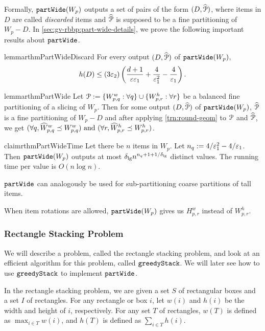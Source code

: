 Formally, $\operatorname{\mathtt{partWide}}(W_p)$ outputs a set of pairs of the form $(D, \widehat{\mathcal{P}})$,
where items in $D$ are called \emph{discarded} items and $\widehat{\mathcal{P}}$ is supposed to be
a fine partitioning of $W_p - D$.
In \cref{sec:gv-rbbp:part-wide-details}, we prove the following important
results about $\operatorname{\mathtt{partWide}}$.

\begin{restatable}{lemma}{rthmPartWideDiscard}
\label{lem:part-wide-discard}
For every output $(D, \widehat{\mathcal{P}})$ of $\operatorname{\mathtt{partWide}}(W_p)$,
\[ h(D) \le (3\varepsilon_2)\left( \frac{d+1}{\varepsilon\varepsilon_1} + \frac{4}{\varepsilon_1^2}
    - \frac{4}{\varepsilon_1} \right). \]
\end{restatable}

\begin{restatable}{lemma}{rthmPartWide}
\label{lem:part-wide}
Let $\mathcal{P} := \{W_{p,q}^w: \forall q\} \cup \{W_{p,r}^h: \forall r\}$ be
a balanced fine partitioning of a slicing of $W_p$.
Then for some output $(D, \widehat{\mathcal{P}})$ of $\operatorname{\mathtt{partWide}}(W_p)$,
$\widehat{\mathcal{P}}$ is a fine partitioning of $W_p - D$
and after applying \cref{trn:round-geom} to $\mathcal{P}$ and $\widehat{\mathcal{P}}$, we get
$(\forall q, \widehat{W}^w_{p,q} \preceq W^w_{p,q})
\textrm{ and } (\forall r, \widehat{W}^h_{p,r} \preceq W^h_{p,r})$.
\end{restatable}

\begin{restatable}{claim}{rthmPartWideTime}
\label{claim:part-wide-time}
Let there be $n$ items in $W_p$. Let $n_q := 4/\varepsilon_1^2 - 4/\varepsilon_1$.
Then $\operatorname{\mathtt{partWide}}(W_p)$ outputs at most $\delta_{\mathrm{lg}} n^{n_q + 1 + 1/\delta_{\mathrm{lg}}}$
distinct values. The running time per value is $O(n\log n)$.
\end{restatable}

$\operatorname{\mathtt{partWide}}$ can analogously be used for sub-partitioning coarse partitions of tall items.

When item rotations are allowed, $\operatorname{\mathtt{partWide}}(W_p)$ gives us $H^w_{p,r}$ instead of $W^h_{p,r}$.

\subsubsection{Rectangle Stacking Problem}
\label{sec:gv-rbbp:greedy-stack}

We will describe a problem, called the rectangle stacking problem,
and look at an efficient algorithm for this problem, called $\operatorname{\mathtt{greedyStack}}$.
We will later see how to use $\operatorname{\mathtt{greedyStack}}$ to implement $\operatorname{\mathtt{partWide}}$.

In the rectangle stacking problem, we are given a set $S$ of rectangular boxes
and a set $I$ of rectangles.
For any rectangle or box $i$, let $w(i)$ and $h(i)$ be the width and height of $i$, respectively.
For any set $T$ of rectangles, $w(T)$ is defined as $\max_{i \in T} w(i)$,
and $h(T)$ is defined as $\sum_{i \in T} h(i)$.


